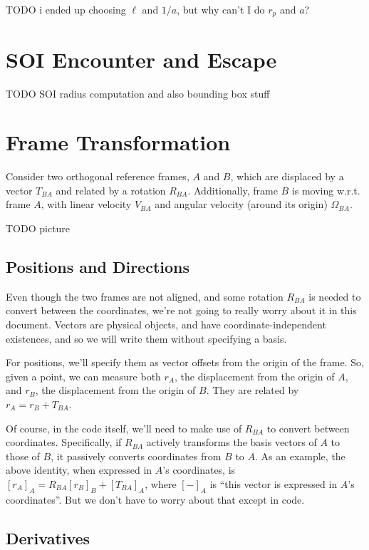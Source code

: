 \documentclass{article}
\numberwithin{equation}{subsection}
\begin{document}
TODO i ended up choosing $\ell$ and $1/a$, but why can't I do $r_p$ and $a$?

\section{SOI Encounter and Escape}

TODO SOI radius computation and also bounding box stuff

\section{Frame Transformation}
Consider two orthogonal reference frames, $A$ and $B$, which are displaced by a vector $T_{BA}$ and related by a rotation $R_{BA}$. Additionally, frame $B$ is moving w.r.t. frame $A$, with linear velocity $V_{BA}$ and angular velocity (around its origin) $\Omega_{BA}$.

TODO picture

\subsection{Positions and Directions}

Even though the two frames are not aligned, and some rotation $R_{BA}$ is needed to convert between the coordinates, we're not going to really worry about it in this document. Vectors are physical objects, and have coordinate-independent existences, and so we will write them without specifying a basis.

For positions, we'll specify them as vector offsets from the origin of the frame. So, given a point, we can measure both $r_A$, the displacement from the origin of $A$, and $r_B$, the displacement from the origin of $B$. They are related by $r_A = r_B + T_{BA}$.

Of course, in the code itself, we'll need to make use of $R_{BA}$ to convert between coordinates. Specifically, if $R_{BA}$ actively transforms the basis vectors of $A$ to those of $B$, it passively converts coordinates from $B$ to $A$. As an example, the above identity, when expressed in $A$'s coordinates, is $[r_A]_A = R_{BA} [r_B]_B + [T_{BA}]_A$, where $[-]_A$ is ``this vector is expressed in $A$'s coordinates''. But we don't have to worry about that except in code.

\subsection{Derivatives}
\end{document}

